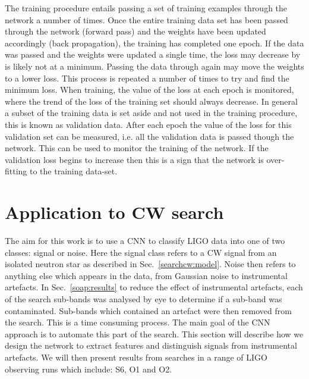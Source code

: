 The training procedure entails passing a set of training examples through the network a number of times. 
Once the entire training data set has been passed through the network (forward pass) and the weights have been updated accordingly (back propagation), the training has completed one epoch.
If the data was passed and the weights were updated a single time, the loss may decrease by is likely not at a minimum.
Passing the data through again may move the weights to a lower loss.
This process is repeated a number of times to try and find the minimum loss.
When training, the value of the loss at each epoch is monitored, where the trend of the loss of the training set should always decrease. 
In general a subset of the training data is set aside and not used in the training procedure, this is known as validation data. 
After each epoch the value of the loss for this validation set can be measured, i.e. all the validation data is passed though the network. 
This can be used to monitor the training of the network. If the validation loss begins to increase then this is a sign that the network is over-fitting to the training data-set.


\section{\label{machine:cw}Application to CW search}

The aim for this work is to use a \gls{CNN} to classify \gls{LIGO} data into one of two classes: signal or noise.
Here the signal class refers to a \gls{CW} signal from an isolated neutron star as described in Sec.~\ref{searchcw:model}.
Noise then refers to anything else which appears in the data, from Gaussian noise to instrumental artefacts. 
In Sec.~\ref{soap:results} to reduce the effect of instrumental artefacts, each of the search sub-bands was analysed by eye to determine if a sub-band was contaminated. 
Sub-bands which contained an artefact were then removed from the search.
This is a time consuming process. The main goal of the \gls{CNN} approach is to automate this part of the search.
This section will describe how we design the network to extract features and distinguish signals from instrumental artefacts.
We will then present results from searches in a range of \gls{LIGO} observing runs which include: S6, O1 and O2.



